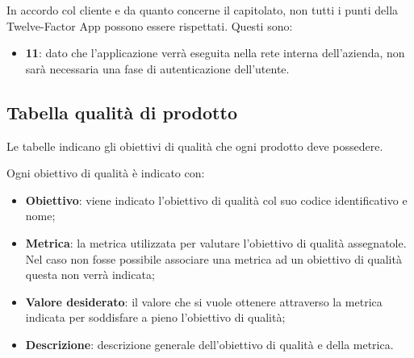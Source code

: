 In accordo col cliente \II e da quanto concerne il capitolato, non tutti i punti della Twelve-Factor App possono essere rispettati. Questi sono:

\begin{itemize}
	\item \textbf{11}: dato che l'applicazione verrà eseguita nella rete interna dell'azienda, non sarà necessaria una fase di autenticazione dell'utente.
\end{itemize}

\subsection{Tabella qualità di prodotto}
Le tabelle indicano gli obiettivi di qualità che ogni prodotto deve possedere.

Ogni obiettivo di qualità è indicato con:

\begin{itemize}
	\item \textbf{Obiettivo}: viene indicato l'obiettivo di qualità col suo codice identificativo e nome;
	\item \textbf{Metrica}: la metrica utilizzata per valutare l'obiettivo di qualità assegnatole. Nel caso non fosse possibile associare una metrica ad un obiettivo di qualità questa non verrà indicata;
	\item \textbf{Valore desiderato}: il valore che si vuole ottenere attraverso la metrica indicata per soddisfare a pieno l'obiettivo di qualità;
	\item \textbf{Descrizione}: descrizione generale dell'obiettivo di qualità e della metrica.
\end{itemize}

